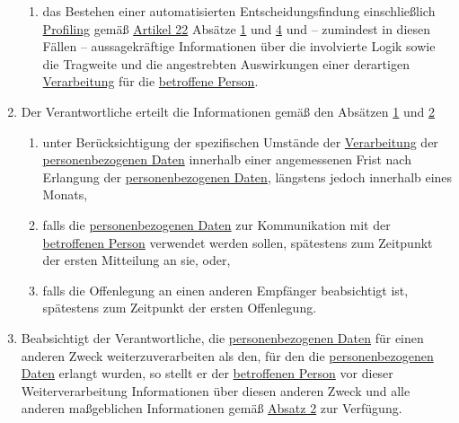 \begin{enumerate}
\begin{enumerate}
    \item das Bestehen einer automatisierten Entscheidungsfindung einschließlich \hyperref[itm:04-4]{Profiling} gemäß \hyperref[ch:22]
     {Artikel 22} Absätze \hyperref[itm:22-1]{1} und \hyperref[itm:22-4]{4} und -- zumindest in diesen Fällen --
     aussagekräftige Informationen über die involvierte Logik sowie die Tragweite und die angestrebten Auswirkungen
     einer derartigen \hyperref[itm:04-2]{Verarbeitung} für die \hyperref[itm:04-1]{betroffene Person}.
    \label{itm:14-2g}

  \end{enumerate}

  \item Der Verantwortliche erteilt die Informationen gemäß den Absätzen \hyperref[itm:14-1]{1} und \hyperref[itm:14-2]
  {2}
  \label{itm:14-3}

  \begin{enumerate}
  
    \item unter Berücksichtigung der spezifischen Umstände der \hyperref[itm:04-2]{Verarbeitung} der \hyperref[itm:04-1]{personenbezogenen Daten} innerhalb einer
     angemessenen Frist nach Erlangung der \hyperref[itm:04-1]{personenbezogenen Daten}, längstens jedoch innerhalb eines Monats,
    \label{itm:14-3a}

    \item falls die \hyperref[itm:04-1]{personenbezogenen Daten} zur Kommunikation mit der \hyperref[itm:04-1]{betroffenen Person} verwendet werden sollen,
     spätestens zum Zeitpunkt der ersten Mitteilung an sie, oder,
    \label{itm:14-3b}

    \item falls die Offenlegung an einen anderen Empfänger beabsichtigt ist, spätestens zum Zeitpunkt der ersten
     Offenlegung.
    \label{itm:14-3c}

  \end{enumerate}

  \item Beabsichtigt der Verantwortliche, die \hyperref[itm:04-1]{personenbezogenen Daten} für einen anderen Zweck weiterzuverarbeiten als
   den, für den die \hyperref[itm:04-1]{personenbezogenen Daten} erlangt wurden, so stellt er der \hyperref[itm:04-1]{betroffenen Person} vor dieser
   Weiterverarbeitung Informationen über diesen anderen Zweck und alle anderen maßgeblichen Informationen gemäß
   \hyperref[itm:14-2]{Absatz 2} zur Verfügung.
  \label{itm:14-4}


\end{enumerate}
